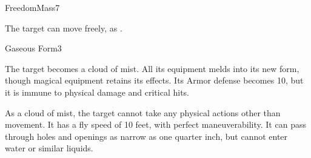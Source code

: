 \begin{spellsection}{Freedom}{Mass}{7}
\begin{spellheader}
\end{spellheader}
\begin{spellcontent}
    \begin{spelltargetinginfo}
    \end{spelltargetinginfo}
    \begin{spelleffects}
        \spelleffect The target can move freely, as .
        \spelldur \durshort
    \end{spelleffects}
\end{spellcontent}
\begin{spellfooter}
\end{spellfooter}

\begin{comment}
\subsubsection{G}
\end{comment}
\end{spellsection}

\begin{spellsection}{Gaseous Form}{3}
\begin{spellheader}
\end{spellheader}
\begin{spellcontent}
    \begin{spelltargetinginfo}
    \end{spelltargetinginfo}
    \begin{spelleffects}
        \spelleffect The target becomes a cloud of mist. All its equipment melds into its new form, though magical equipment retains its effects. Its Armor defense becomes 10, but it is immune to physical damage and critical hits.

        As a cloud of mist, the target cannot take any physical actions other than movement. It has a fly speed of 10 feet, with perfect maneuverability. It can pass through holes and openings as narrow as one quarter inch, but cannot enter water or similar liquids.
        \spelldur \durshort \dismissable
    \end{spelleffects}
\end{spellcontent}
\begin{spellfooter}
\end{spellfooter}
\end{spellsection}


